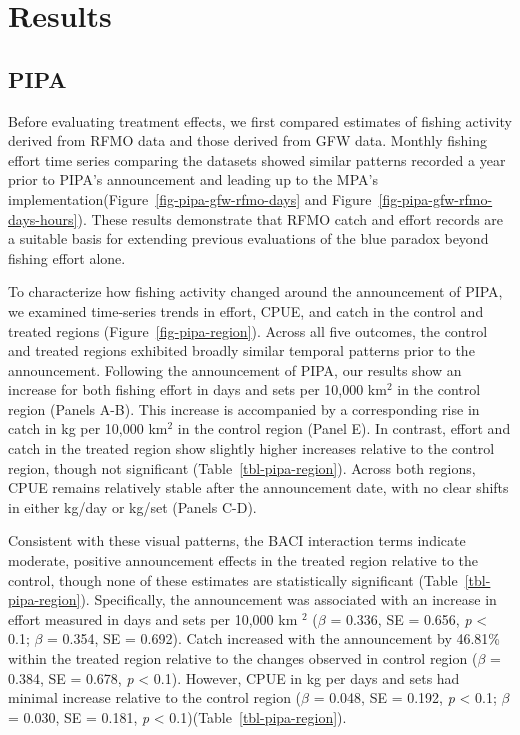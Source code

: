 \documentclass[
  letterpaper,
  DIV=11,
  numbers=noendperiod]{scrartcl}
\begin{document}
\section{Results}\label{results}

\subsection{PIPA}\label{pipa}

Before evaluating treatment effects, we first compared estimates of
fishing activity derived from RFMO data and those derived from GFW data.
Monthly fishing effort time series comparing the datasets showed similar
patterns recorded a year prior to PIPA's announcement and leading up to
the MPA's implementation(Figure~\ref{fig-pipa-gfw-rfmo-days} and
Figure~\ref{fig-pipa-gfw-rfmo-days-hours}). These results demonstrate
that RFMO catch and effort records are a suitable basis for extending
previous evaluations of the blue paradox beyond fishing effort alone.

To characterize how fishing activity changed around the announcement of
PIPA, we examined time-series trends in effort, CPUE, and catch in the
control and treated regions (Figure~\ref{fig-pipa-region}). Across all
five outcomes, the control and treated regions exhibited broadly similar
temporal patterns prior to the announcement. Following the announcement
of PIPA, our results show an increase for both fishing effort in days
and sets per 10,000 km\(^2\) in the control region (Panels A-B). This
increase is accompanied by a corresponding rise in catch in kg per
10,000 km\(^2\) in the control region (Panel E). In contrast, effort and
catch in the treated region show slightly higher increases relative to
the control region, though not significant
(Table~\ref{tbl-pipa-region}). Across both regions, CPUE remains
relatively stable after the announcement date, with no clear shifts in
either kg/day or kg/set (Panels C-D).

Consistent with these visual patterns, the BACI interaction terms
indicate moderate, positive announcement effects in the treated region
relative to the control, though none of these estimates are
statistically significant (Table~\ref{tbl-pipa-region}). Specifically,
the announcement was associated with an increase in effort measured in
days and sets per 10,000 km \(^2\) (\(\beta\) = 0.336, SE = 0.656,
\emph{p} \textless{} 0.1; \(\beta\) = 0.354, SE = 0.692). Catch
increased with the announcement by 46.81\% within the treated region
relative to the changes observed in control region (\(\beta\) = 0.384,
SE = 0.678, \emph{p} \textless{} 0.1). However, CPUE in kg per days and
sets had minimal increase relative to the control region (\(\beta\) =
0.048, SE = 0.192, \emph{p} \textless{} 0.1; \(\beta\) = 0.030, SE =
0.181, \emph{p} \textless{} 0.1)(Table~\ref{tbl-pipa-region}).
\end{document}
